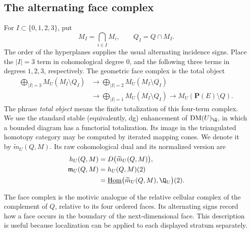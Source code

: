 \subsection{The alternating face complex}
\label{cp:subsec-face-complex}

\begin{definition}
\label{cp:def-face-motive}
For \(I\subset\{0,1,2,3\}\), put
\[
 M_I=\bigcap_{i\in I}M_i,
 \qquad Q_I=Q\cap M_I.
\]
The order of the hyperplanes supplies the usual alternating incidence
signs.  Place the \(|I|=3\) term in cohomological degree \(0\), and the
following three terms in degrees \(1,2,3\), respectively.  The geometric
face complex is the total object
\begin{equation}
\begin{split}
 \bigoplus_{|I|=3}M_U(M_I\setminus Q_I)
 &\longrightarrow
 \bigoplus_{|I|=2}M_U(M_I\setminus Q_I)\\
 &\longrightarrow
 \bigoplus_{|I|=1}M_U(M_I\setminus Q_I)
 \longrightarrow M_U(\mathbf P(E)\setminus Q).
\end{split}
 \label{cp:eq-geometric-face-complex}
\end{equation}
The phrase \emph{total object} means the finite totalization of this
four-term complex.  We use the standard stable (equivalently, dg)
enhancement of \(\operatorname{DM}(U)_\Q\), in which a bounded diagram has a
functorial totalization.  Its image in the triangulated homotopy category may
be computed by iterated mapping cones.
We denote it by \(\widetilde m_U(Q,M)\).  Its raw cohomological dual and its
normalized version are
\begin{equation}
\begin{aligned}
 h_U(Q,M)&=D\bigl(\widetilde m_U(Q,M)\bigr),\\
 \mathfrak m_U(Q,M)&=h_U(Q,M)(2)\\
 &=\underline{\operatorname{Hom}}
       \bigl(\widetilde m_U(Q,M),\Q_U\bigr)(2).
\end{aligned}
 \label{cp:eq-normalized-relative-motive}
\end{equation}
\end{definition}

The face complex is the motivic analogue of the relative cellular complex
of the complement of \(Q\), relative to its four ordered faces.  Its
alternating signs record how a face occurs in the boundary of the
next-dimensional face.  This description is useful because localization
can be applied to each displayed stratum separately.

